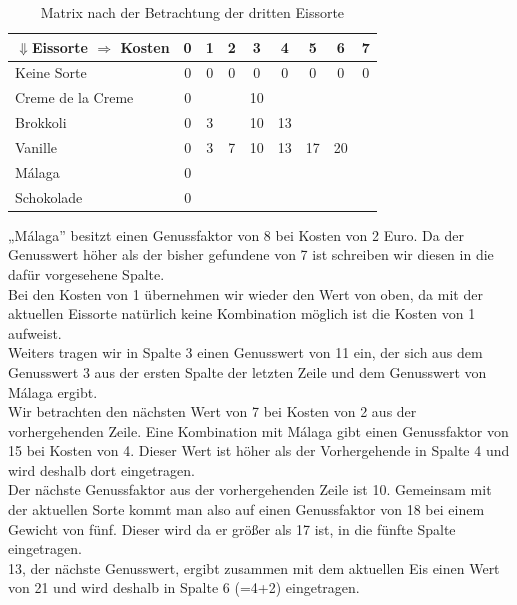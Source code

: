 \documentclass[a4paper, 12pt]{article}
\begin{document}
\begin{table}[H]
	\begin{center}
		\begin{tabular}{l|cccccccc}
			$\Downarrow$Eissorte $\Rightarrow$ Kosten & 0 & 1 & 2 & 3 & 4 & 5 &
			6 & 7\\
			\hline
			Keine Sorte			& 0 & 0 & 0 & 0	 &	0 &	 0 & 0 & 0	\\
			Creme de la Creme	& 0 &	&	& 10 &	  &	   &	&	\\
			Brokkoli			& 0 & 3 &	& 10 & 13 &	   &	&	\\
			Vanille				& 0 & 3 & 7 & 10 & 13 & 17 & 20 &	\\
			Málaga				& 0 &	&	&	 &	  &	   &	&	\\
			Schokolade			& 0 &	&	&	 &	  &	   &	&	\\
		\end{tabular}
	\end{center}
\caption{Matrix nach der Betrachtung der dritten Eissorte}
\label{table:3_Eis}
\end{table}

„Málaga” besitzt einen Genussfaktor von 8 bei Kosten von 2 Euro. Da der Genusswert höher als der bisher gefundene von 7 ist schreiben wir diesen in die dafür vorgesehene Spalte.\\

Bei den Kosten von 1 übernehmen wir wieder den Wert von oben, da mit der aktuellen Eissorte natürlich keine Kombination möglich ist die Kosten von 1 aufweist.\\

Weiters tragen wir in Spalte 3 einen Genusswert von 11 ein, der sich aus dem Genusswert 3 aus der ersten Spalte der letzten Zeile und dem Genusswert von Málaga ergibt.\\

Wir betrachten den nächsten Wert von 7 bei Kosten von 2 aus der vorhergehenden Zeile. Eine Kombination mit Málaga gibt einen Genussfaktor von 15 bei Kosten von 4. Dieser Wert ist höher als der Vorhergehende in Spalte 4 und wird deshalb dort eingetragen.\\

Der nächste Genussfaktor aus der vorhergehenden Zeile ist 10. Gemeinsam mit der aktuellen Sorte kommt man also auf einen Genussfaktor von 18 bei einem Gewicht von fünf. Dieser wird da er größer als 17 ist, in die fünfte Spalte eingetragen.\\

13, der nächste Genusswert, ergibt zusammen mit dem aktuellen Eis einen Wert von 21 und wird deshalb in Spalte 6 (=4+2) eingetragen.\\
\end{document}

